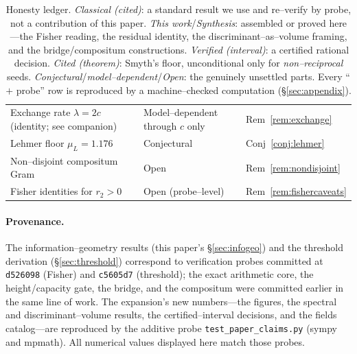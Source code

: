 \documentclass[11pt]{article}
\theoremstyle{plain}
\theoremstyle{definition}
\theoremstyle{remark}
\begin{document}
\begin{table}[ht]
\begin{tabular}{p{} l l}
Exchange rate $\lambda=2c$ (identity; see companion) & Model--dependent through $c$ only & Rem~\ref{rem:exchange} \\
Lehmer floor $\mu_L=1.176$ & Conjectural & Conj~\ref{conj:lehmer} \\
Non--disjoint compositum Gram & Open & Rem~\ref{rem:nondisjoint} \\
Fisher identities for $r_2>0$ & Open (probe--level) & Rem~\ref{rem:fishercaveats} \\
\bottomrule
\end{tabular}
\caption{Honesty ledger. \emph{Classical (cited)}: a standard result we use and re--verify by probe, not a
contribution of this paper. \emph{This work}/\emph{Synthesis}: assembled or proved here---the Fisher reading,
the residual identity, the discriminant--as--volume framing, and the bridge/compositum constructions.
\emph{Verified (interval)}: a certified rational decision. \emph{Cited (theorem)}: Smyth's floor,
unconditional only for \emph{non--reciprocal} seeds. \emph{Conjectural}/\emph{model--dependent}/\emph{Open}:
the genuinely unsettled parts. Every ``$+$ probe'' row is reproduced by a machine--checked computation
(\S\ref{sec:appendix}).}
\label{tab:ledger}
\end{table}

\paragraph{Provenance.} The information--geometry results (this paper's \S\ref{sec:infogeo}) and the
threshold derivation (\S\ref{sec:threshold}) correspond to verification probes committed at
\texttt{d526098} (Fisher) and \texttt{c5605d7} (threshold); the exact arithmetic core, the height/capacity
gate, the bridge, and the compositum were committed earlier in the same line of work. The expansion's new
numbers---the figures, the spectral and discriminant--volume results, the certified--interval decisions, and
the fields catalog---are reproduced by the additive probe \texttt{test\_paper\_claims.py} (sympy and mpmath).
All numerical values displayed here match those probes.
\end{document}
